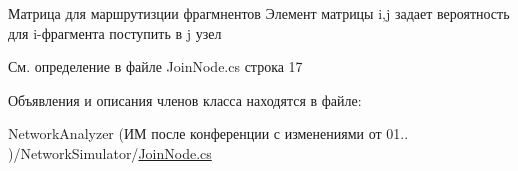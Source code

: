 Матрица для маршрутизции фрагмнентов Элемент матрицы i,j задает вероятность для i-\/фрагмента поступить в j узел 



См. определение в файле Join\+Node.\+cs строка 17



Объявления и описания членов класса находятся в файле\+:\begin{DoxyCompactItemize}
\item 
Network\+Analyzer (ИМ после конференции  с изменениями от 01.. )/\+Network\+Simulator/\hyperlink{_join_node_8cs}{Join\+Node.\+cs}\end{DoxyCompactItemize}
